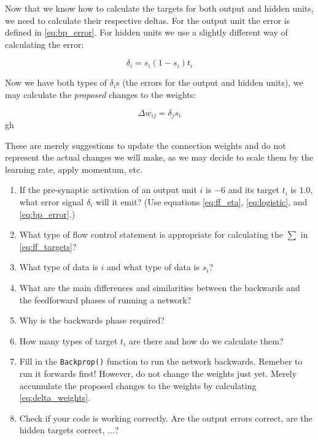 \documentclass[a4paper,10pt]{article}
\begin{document}
Now that we know how to calculate the targets for both output and hidden units, we need to calculate their respective deltas. For the output unit the error is defined in \autoref{eq:bp_error}. For hidden units we use a slightly different way of calculating the error:

\begin{equation}
\label{eq:hidden_error}
\delta_i = s_i (1 - s_i)  t_i
\end{equation}

Now we have both types of $\delta_i$s (the errors for the output and hidden units), we may calculate the \emph{proposed} changes to the weights:

\begin{equation}
\label{eq:delta_weights}
\Delta w_{ij}= \delta_j s_i
\end{equation}
gh

These are merely suggestions to update the connection weights and do not represent the actual changes we will make, as we may decide to scale them by the learning rate, apply momentum, etc.

\begin{enumerate}
 \item If the pre-synaptic activation of an output unit $i$ is $-6$ and its target $t_i$ is $1.0$, what error signal $\delta_i$ will it emit? (Use equations \ref{eq:ff_eta}, \ref{eq:logistic}, and \ref{eq:bp_error}.)
 
 \item What type of flow control statement is appropriate for calculating the $\sum$ in \autoref{eq:ff_targets}?
 
 \item What type of data is $i$ and what type of data is $s_i$?
 
 \item What are the main differences and similarities between the backwards and the feedforward phases of running a network?
 
 \item Why is the backwards phase required?
 
 \item How many types of target $t_i$ are there and how do we calculate them?

 
 
  \item Fill in the \texttt{Backprop()} function to run the network backwards. Remeber to run it forwards first!  However, do not change the weights just yet. Merely accumulate the proposed changes to the weights by calculating \autoref{eq:delta_weights}. 

 \item Check if your code is working correctly. Are the output errors correct, are the hidden targets correct, ...?

 
 
 \end{enumerate}
\end{document}
